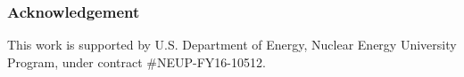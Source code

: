 \begin{frame}
  \frametitle{Acknowledgement}
  This work is supported by U.S. Department of Energy, 
  Nuclear Energy University Program, under contract 
  \#NEUP-FY16-10512. 
  \end{frame}
